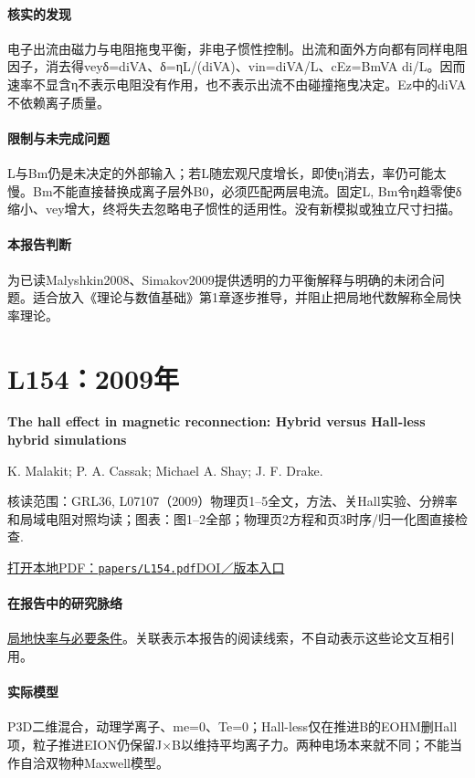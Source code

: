 \documentclass[UTF8,a4paper,11pt,openany,fontset=fandol]{ctexbook}
\begin{document}
\paragraph{核实的发现}电子出流由磁力与电阻拖曳平衡，非电子惯性控制。出流和面外方向都有同样电阻因子，消去得veyδ=diVA、δ=ηL/(diVA)、vin=diVA/L、cEz=BmVA di/L。因而速率不显含η不表示电阻没有作用，也不表示出流不由碰撞拖曳决定。Ez中的diVA不依赖离子质量。

\paragraph{限制与未完成问题}L与Bm仍是未决定的外部输入；若L随宏观尺度增长，即使η消去，率仍可能太慢。Bm不能直接替换成离子层外B0，必须匹配两层电流。固定L, Bm令η趋零使δ缩小、vey增大，终将失去忽略电子惯性的适用性。没有新模拟或独立尺寸扫描。

\paragraph{本报告判断}为已读Malyshkin2008、Simakov2009提供透明的力平衡解释与明确的未闭合问题。适合放入《理论与数值基础》第1章逐步推导，并阻止把局地代数解称全局快率理论。

\section{L154：2009年}\label{paper:L154}

\textbf{The hall effect in magnetic reconnection: Hybrid versus Hall‐less hybrid simulations}\citep{L154}\

K. Malakit;  P. A. Cassak;  Michael A. Shay;  J. F. Drake.

\textsf{核读范围：}GRL36, L07107（2009）物理页1–5全文，方法、关Hall实验、分辨率和局域电阻对照均读；\textsf{图表：}图1–2全部；物理页2方程和页3时序/归一化图直接检查.

\href{run:../papers/L154.pdf}{打开本地PDF：\texttt{papers/L154.pdf}}\quad\href{https://doi.org/10.1029/2009gl037538}{DOI／版本入口}

\paragraph{在报告中的研究脉络}\hyperref[story:fast]{局地快率与必要条件}。关联表示本报告的阅读线索，不自动表示这些论文互相引用。

\paragraph{实际模型}P3D二维混合，动理学离子、me=0、Te=0；Hall-less仅在推进B的EOHM删Hall项，粒子推进EION仍保留J×B以维持平均离子力。两种电场本来就不同；不能当作自洽双物种Maxwell模型。
\end{document}
